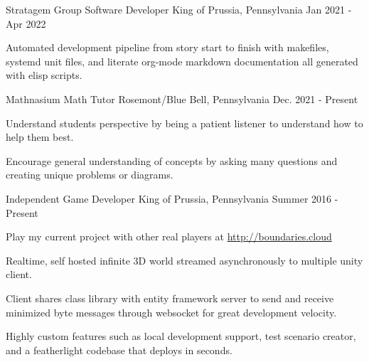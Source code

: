 

\begin{cventries}

  \cventry
    {Stratagem Group} %
    {Software Developer} %
    {King of Prussia, Pennsylvania} %
    {Jan 2021 - Apr 2022} %
    {
      \begin{cvitems} %
        \item {Automated development pipeline from story start to finish
               with makefiles, systemd unit files, and literate org-mode markdown documentation
               all generated with elisp scripts.}
      \end{cvitems}
    }

  \cventry
    {Mathnasium} %
    {Math Tutor} %
    {Rosemont/Blue Bell, Pennsylvania} %
    {Dec. 2021 - Present} %
    {
      \begin{cvitems} %
        \item {Understand students perspective by being a patient listener to understand how to help them best.}
        \item {Encourage general understanding of concepts by asking many questions and creating unique problems or diagrams.}
      \end{cvitems}
    }

  \cventry
    {Independent} %
    {Game Developer} %
    {King of Prussia, Pennsylvania} %
    {Summer 2016 - Present} %
    {
      \begin{cvitems} %
        \item {Play my current project with other real players at \url{http://boundaries.cloud}}
        \item {Realtime, self hosted infinite 3D world streamed asynchronously to multiple unity client.}
        \item {Client shares class library with entity framework server to send and receive minimized byte messages through websocket for great development velocity.}
        \item {Highly custom features such as local development support, test scenario creator, and a featherlight codebase that deploys in seconds.}
      \end{cvitems}
    }


\end{cventries}
